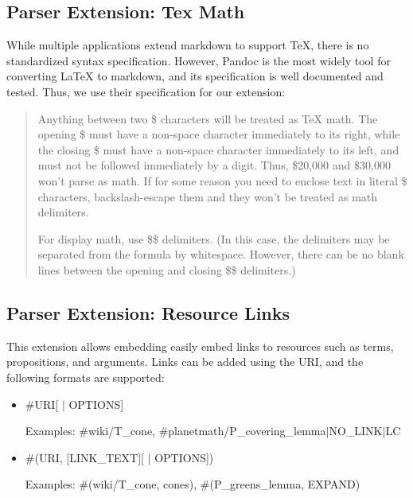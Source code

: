 \documentclass[a4paper]{article}
\begin{document}
\subsection{Parser Extension: Tex Math}

While multiple applications extend markdown to support TeX, there is no standardized syntax specification. However, Pandoc is the most widely tool for converting LaTeX to markdown, and its specification is well documented and tested. Thus, we use their specification for our extension\cite{pandoc}:


\blockquote{Anything between two \$ characters will be treated as TeX math. The opening \$ must have a non-space character immediately to its right, while the closing \$ must have a non-space character immediately to its left, and must not be followed immediately by a digit. Thus, \$20,000 and \$30,000 won’t parse as math. If for some reason you need to enclose text in literal \$ characters, backslash-escape them and they won’t be treated as math delimiters.


For display math, use \$\$ delimiters. (In this case, the delimiters may be separated from the formula by whitespace. However, there can be no blank lines between the opening and closing \$\$ delimiters.)}


\subsection{Parser Extension: Resource Links}

This extension allows embedding easily embed links to resources such as terms, propositions, and arguments. Links can be added using the URI, and the following formats are supported:


\begin{itemize}

	\item \#URI[ $\vert$ OPTIONS]


	Examples: \#wiki/T\_cone, \#planetmath/P\_covering\_lemma$\vert$NO\_LINK$\vert$LC

	\item \#(URI, [\textquotesingle LINK\_TEXT\textquotesingle][ $\vert$ OPTIONS])

	

	Examples: \#(wiki/T\_cone, \textquotesingle cones\textquotesingle), \#(P\_greens\_lemma, EXPAND)

\end{itemize}
\end{document}
